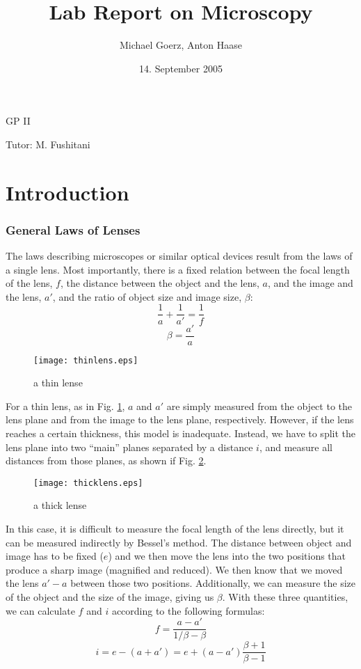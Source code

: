 \documentclass[a4paper,10pt]{article}
\title{Lab Report on Microscopy}
\author{Michael Goerz, Anton Haase}
\date{14. September 2005}
\begin{document}
\maketitle
\noindent GP II

\noindent Tutor: M. Fushitani

\section{Introduction}
\subsubsection*{General Laws of Lenses}
The laws describing microscopes or similar optical devices result from the laws of a single lens.
Most importantly, there is a fixed relation between the focal length of the lens, $f$, the distance between the object and the lens, $a$, and the image and the lens, $a'$, and the ratio of object size and image size, $\beta$:
\begin{equation}
\frac{1}{a} + \frac{1}{a'}=\frac{1}{f} \label{eq1}
\end{equation}
\begin{equation}
\beta = \frac{a'}{a}
\end{equation}

\begin{figure}[htbp]
    \centering
    \texttt{[image: thinlens.eps]}
    \caption{a thin lense}
    \label{thinlens}
\end{figure}

For a thin lens, as in Fig. \ref{thinlens}, $a$ and $a'$ are simply measured from the object to the lens plane and from the image to the lens plane, respectively. However, if the lens reaches a certain thickness, this model is inadequate. Instead, we have to split the lens plane into two ``main'' planes separated by a distance $i$, and measure all distances from those planes, as shown if Fig. \ref{thicklens}.

\begin{figure}[htbp]
    \centering
    \texttt{[image: thicklens.eps]}
    \caption{a thick lense}
    \label{thicklens}
\end{figure}

In this case, it is difficult to measure the focal length of the lens directly, but it can be measured indirectly by Bessel's method. The distance between object and image has to be fixed ($e$) and we then move the lens into the two positions that produce a sharp image (magnified and reduced). We then know that we moved the lens $a'-a$ between those two positions. Additionally, we can measure the size of the object and the size of the image, giving us $\beta$. With these three quantities, we can calculate $f$ and $i$ according to the following formulas:
\begin{equation}
f=\frac{a-a'}{1/\beta - \beta} \label{eqfocal1}
\end{equation}
\begin{equation}
i = e - (a+a') = e + (a-a') \frac{\beta + 1}{\beta-1} \label{eqi}
\end{equation}
\end{document}
